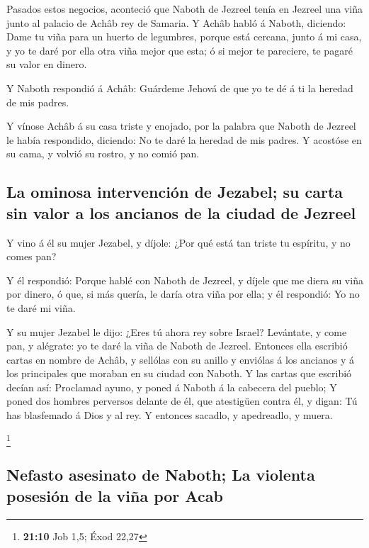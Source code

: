  Pasados estos negocios, aconteció que Naboth de Jezreel
tenía en Jezreel una viña junto al palacio de Achâb rey de Samaria.
 Y Achâb habló á Naboth, diciendo: Dame tu viña para un
huerto de legumbres, porque está cercana, junto á mi casa, y yo te daré
por ella otra viña mejor que esta; ó si mejor te pareciere, te pagaré su
valor en dinero.

 Y Naboth respondió á Achâb: Guárdeme Jehová de que yo te
dé á ti la heredad de mis padres.

 Y vínose Achâb á su casa triste y enojado, por la palabra
que Naboth de Jezreel le había respondido, diciendo: No te daré la
heredad de mis padres. Y acostóse en su cama, y volvió su rostro, y no
comió pan.

\hypertarget{la-ominosa-intervenciuxf3n-de-jezabel-su-carta-sin-valor-a-los-ancianos-de-la-ciudad-de-jezreel}{%
\subsection{La ominosa intervención de Jezabel; su carta sin valor a los
ancianos de la ciudad de
Jezreel}\label{la-ominosa-intervenciuxf3n-de-jezabel-su-carta-sin-valor-a-los-ancianos-de-la-ciudad-de-jezreel}}

 Y vino á él su mujer Jezabel, y díjole: ¿Por qué está tan
triste tu espíritu, y no comes pan?

 Y él respondió: Porque hablé con Naboth de Jezreel, y
díjele que me diera su viña por dinero, ó que, si más quería, le daría
otra viña por ella; y él respondió: Yo no te daré mi viña.

 Y su mujer Jezabel le dijo: ¿Eres tú ahora rey sobre
Israel? Levántate, y come pan, y alégrate: yo te daré la viña de Naboth
de Jezreel.  Entonces ella escribió cartas en nombre de
Achâb, y sellólas con su anillo y enviólas á los ancianos y á los
principales que moraban en su ciudad con Naboth.  Y las
cartas que escribió decían así: Proclamad ayuno, y poned á Naboth á la
cabecera del pueblo;  Y poned dos hombres perversos
delante de él, que atestigüen contra él, y digan: Tú has blasfemado á
Dios y al rey. Y entonces sacadlo, y apedreadlo, y muera.

\footnote{\textbf{21:10} Job 1,5; Éxod 22,27}

\hypertarget{nefasto-asesinato-de-naboth-la-violenta-posesiuxf3n-de-la-viuxf1a-por-acab}{%
\subsection{Nefasto asesinato de Naboth; La violenta posesión de la viña
por
Acab}\label{nefasto-asesinato-de-naboth-la-violenta-posesiuxf3n-de-la-viuxf1a-por-acab}}

